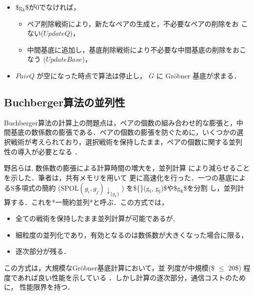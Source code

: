 \documentclass[a4j,12pt]{jarticle}
\begin{document}
{{\begin{enumerate}
\begin{itemize}
\item \$g\(_{\text{k}}\)\$が0でなければ，

\begin{itemize}
\item ペア削除戦術により，新たなペアの生成と，不必要なペアの削除をお
こない(\(UpdateQ\))，

\item 中間基底に追加し，基底削除戦術により不必要な中間基底の削除をおこ
なう (\(UpdateBase\))，
\end{itemize}

\item \(PairQ\) が空になった時点で算法は停止し， \(G\) に Gröbner
基底が求まる．
\end{itemize}
\end{enumerate}

\subsection{Buchberger算法の並列性}
\label{sec:org139d3f0}

Buchberger算法の計算上の問題点は，ペアの個数の組み合わせ的な膨張と，中
間基底の数係数の膨張である．ペアの個数の膨張を防ぐために，いくつかの選
択戦術が考えられており，選択戦術を保持したまま，ペアの個数に関する並列
性の導入が必要となる \cite{strategy-accurate}．

野呂ら\cite{noro97-ap}は, 数係数の膨張による計算時間の増大を，並列計算
により減らせることを示した．筆者\cite{asir-para}は，共有メモリを用いて
更に高速化を行った．一つの基底によるS多項式の簡約
(\({{{\mathrm{SPOL}}(g_i, g_j)\!\downarrow_{\{g_k\}}}}\))
を\$\{\}(g\(_{\text{i}}\), g\(_{\text{j}}\))\$や\$g\(_{\text{k}}\)\$を分割
し，並列計算する．これを*一簡約並列*と呼ぶ．この方式では，

\begin{itemize}
\item 全ての戦術を保持したまま並列計算が可能であるが,

\item 細粒度の並列化であり，有効となるのは数係数が大きくなった場合に限る，

\item 逐次部分が残る．
\end{itemize}

この方式は，大規模なGröbner基底計算\cite{noro97-mckay}において，並
列度が中規模(\$ \(\le\) 20\$) 程度であれば良い性能を示している
\cite{noro97-ap,asir-para}．しかし計算の逐次部分，通信コストのために，
性能限界を持つ．

}}
\end{document}
